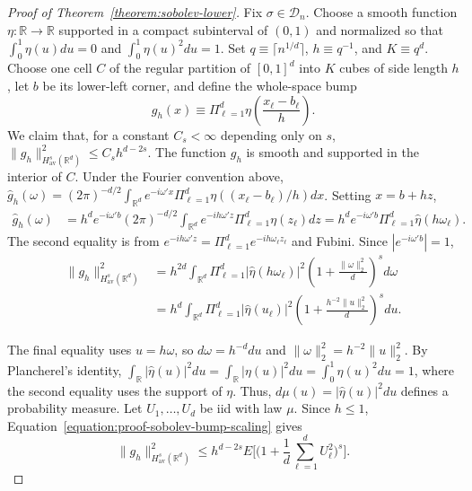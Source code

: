 \documentclass[letterpaper,12pt]{article}
\theoremstyle{definition}
\numberwithin{equation}{section}
\newcommand{\mc}{\mathcal}
\newcommand{\norm}[1]{\lVert#1\rVert}
\begin{document}
\begin{proof}[Proof of Theorem~\ref{theorem:sobolev-lower}]
Fix $\sigma\in\mc D_n$. Choose a smooth function $\eta:\mathbb R\to\mathbb R$ supported in a compact subinterval of $(0,1)$ and normalized so that $\int_0^1\eta(u)du=0$ and $\int_0^1\eta(u)^2du=1$. Set $q\equiv\lceil n^{1/d}\rceil$, $h\equiv q^{-1}$, and $K\equiv q^d$.
Choose one cell $C$ of the regular partition of $[0,1]^d$ into $K$ cubes of side length $h$, let $b$ be its lower-left corner, and define the whole-space bump
\begin{equation*}
g_h(x)\equiv\Pi_{\ell=1}^d\eta\left(\frac{x_\ell-b_\ell}{h}\right).
\end{equation*}
We claim that, for a constant $C_s<\infty$ depending only on $s$, $\norm{g_h}_{H_{\mathrm{av}}^s(\mathbb R^d)}^2\leq C_sh^{d-2s}$.
The function $g_h$ is smooth and supported in the interior of $C$. Under the Fourier convention above, $\widehat g_h(\omega)=(2\pi)^{-d/2}\int_{\mathbb R^d}e^{-i\omega'x}\Pi_{\ell=1}^d\eta((x_\ell-b_\ell)/h)dx$. Setting $x=b+hz$,
\begin{align*}
\widehat g_h(\omega)&=h^de^{-i\omega'b}(2\pi)^{-d/2}\int_{\mathbb R^d}e^{-ih\omega'z}\Pi_{\ell=1}^d\eta(z_\ell)dz =h^de^{-i\omega'b}\Pi_{\ell=1}^d\widehat\eta(h\omega_\ell).
\end{align*}
The second equality is from $e^{-ih\omega'z}=\Pi_{\ell=1}^de^{-ih\omega_\ell z_\ell}$ and Fubini. 
Since $|e^{-i\omega'b}|=1$,
\begin{align}
\norm{g_h}_{H_{\mathrm{av}}^s(\mathbb R^d)}^2&=h^{2d}\int_{\mathbb R^d}\Pi_{\ell=1}^d|\widehat\eta(h\omega_\ell)|^2\left(1+\frac{\norm{\omega}_2^2}{d}\right)^sd\omega\nonumber\\
&=h^d\int_{\mathbb R^d}\Pi_{\ell=1}^d|\widehat\eta(u_\ell)|^2\left(1+\frac{h^{-2}\norm{u}_2^2}{d}\right)^sdu.\label{equation:proof-sobolev-bump-scaling}
\end{align}

The final equality uses $u=h\omega$, so $d\omega=h^{-d}du$ and $\norm{\omega}_2^2=h^{-2}\norm{u}_2^2$.
By Plancherel's identity, $\int_{\mathbb R}|\widehat\eta(u)|^2du=\int_{\mathbb R}|\eta(u)|^2du=\int_0^1\eta(u)^2du=1$, where the second equality uses the support of $\eta$. Thus, $d\mu(u)=|\widehat\eta(u)|^2du$ defines a probability measure. Let $U_1,\ldots,U_d$ be iid with law $\mu$.
Since $h\leq1$, Equation~\eqref{equation:proof-sobolev-bump-scaling} gives
\begin{equation}\label{equation:proof-sobolev-bump-moment}
\norm{g_h}_{H_{\mathrm{av}}^s(\mathbb R^d)}^2\leq h^{d-2s}E\bigg[\bigg(1+\frac1d\sum_{\ell=1}^dU_\ell^2\bigg)^s\bigg].
\end{equation}


\end{proof}
\end{document}

